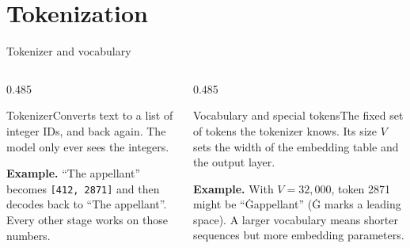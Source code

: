 \documentclass[aspectratio=169,11pt]{beamer}
\newcommand{\code}[1]{\texttt{\small #1}}
\newcommand{\term}[3]{%
  \begin{block}{#1}\small #2\par\vspace{1mm}%
  {\color{exgreen}\textbf{Example.}} #3\end{block}}
\newcommand{\twoterms}[6]{%
  \begin{columns}[T]
    \begin{column}{0.485\textwidth}\term{#1}{#2}{#3}\end{column}
    \begin{column}{0.485\textwidth}\term{#4}{#5}{#6}\end{column}
  \end{columns}}
\begin{document}
\section{Tokenization}

\begin{frame}{Tokenizer and vocabulary}
  \twoterms{Tokenizer}
  {Converts text to a list of integer IDs, and back again. The model only ever sees the integers.}
  {``The appellant'' becomes \code{[412, 2871]} and then decodes back to ``The appellant''. Every other stage works on those numbers.}
  {Vocabulary and special tokens}
  {The fixed set of tokens the tokenizer knows. Its size $V$ sets the width of the embedding table and the output layer.}
  {With $V=32{,}000$, token 2871 might be ``Ġappellant'' (Ġ marks a leading space). A larger vocabulary means shorter sequences but more embedding parameters.}
\end{frame}
\end{document}
